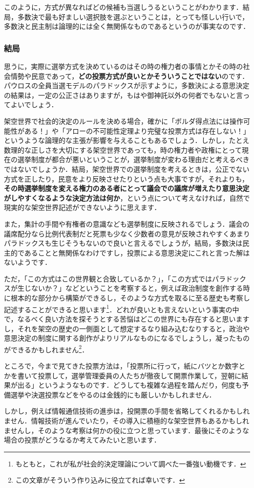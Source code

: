 このように，方式が異なればどの候補も当選しうるということがわかります．結局，多数決で最も好ましい選択肢を選ぶということは，とっても怪しい行いで，多数決と民主制は論理的には全く無関係なものであるというのが事実なのです．

\subsubsection*{結局}
思うに，実際に選挙方式を決めているのはその時の権力者の事情とかその時の社会情勢や民意であって，{\bf どの投票方式が良いとかそういうことではない}のです．パウロスの全員当選モデルのパラドックスが示すように，多数決による意思決定の結果は，一定の公正さはありますが，もはや御神託以外の何者でもないと言ってよいでしょう．

架空世界で社会的決定のルールを決める場合，確かに「ボルダ得点法には操作可能性がある！」や「アローの不可能性定理より完璧な投票方式は存在しない！」というような論理的な主張が影響を与えることもあるでしょう．しかし，たとえ数理的な正しさを大切にする架空世界であっても，時の権力者や政権にとって現在の選挙制度が都合が悪いということが，選挙制度が変わる理由だと考えるべきではないでしょうか．結局，架空世界での選挙制度を考えるときは，公正でない方式を正したり，民意をより反映させたりという点も大事ですが，それよりも，{\bf その時選挙制度を変える権力のある者にとって議会での議席が増えたり意思決定がしやすくなるような決定方法は何か}，という点について考えなければ，自然で現実的な架空世界記述ができないように思えます．

また，集計の手間や有権者の意識なども選挙制度に反映されるでしょう．議会の議席配分なら比例代表制だと死票も少なく少数者の意見が反映されやすくあまりパラドックスも生じそうもないので良いと言えるでしょうが，結局，多数決は民主的であることと無関係なわけですし，投票による意思決定にこれと言った解はないようです．

ただ，「この方式はこの世界観と合致しているか？」，「この方式ではパラドックスが生じないか？」などということを考察すると，例えば政治制度を創作する時に根本的な部分から構築ができるし，そのような方式を取るに至る歴史も考察し記述することができると思います\footnote{もともと，これが私が社会的決定理論について調べた一番強い動機です．}．どれが良いとも言えないという事実の中で，なるべく良い方法を探そうとする苦悩はどこの世界にも存在すると思いますし，それを架空の歴史の一側面として想定するなり組み込むなりすると，政治や意思決定の制度に関する創作がよりリアルなものになるでしょうし，凝ったものができるかもしれません\footnote{この文章がそういう作り込みに役立てれば幸いです．}．

ところで，今まで見てきた投票方法は，「投票所に行って，紙にバツとか数字とかを書いて投票して，選挙管理委員の人たちが徹夜して開票作業して，翌朝に結果が出る」というようなものです．どうしても複雑な過程を踏んだり，何度も予備選挙や決選投票などをやるのは金銭的にも厳しいかもしれません．

しかし，例えば情報通信技術の進歩は，投開票の手間を省略してくれるかもしれません．情報技術が進んでいたり，その導入に積極的な架空世界もあるかもしれませんし，そのような考察は何かの役に立つと思っています．最後にそのような場合の投票がどうなるか考えてみたいと思います．

